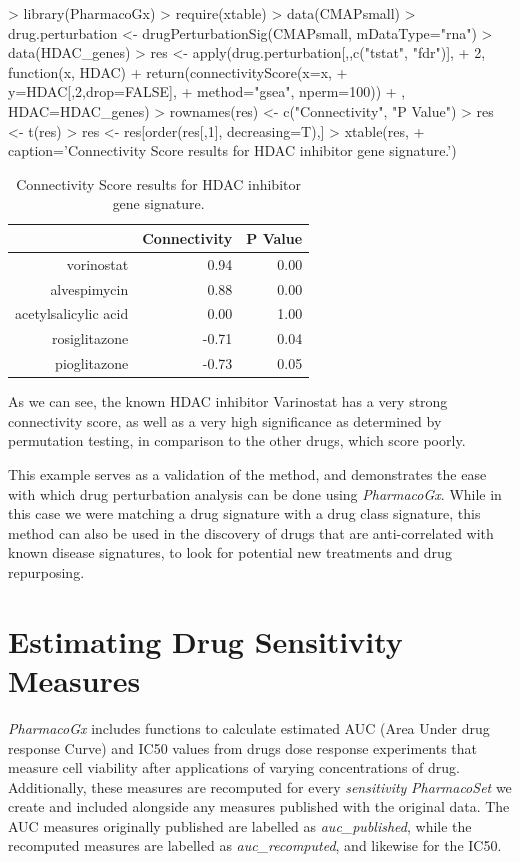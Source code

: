 \documentclass[11pt]{article}
\begin{document}
\begin{Schunk}
\begin{Sinput}
>   library(PharmacoGx)
>   require(xtable)
>   data(CMAPsmall)
>   drug.perturbation <- drugPerturbationSig(CMAPsmall, mDataType="rna")
>   data(HDAC_genes)
>   res <- apply(drug.perturbation[,,c("tstat", "fdr")],
+                2, function(x, HDAC){ 
+ 	    return(connectivityScore(x=x, 
+ 	                             y=HDAC[,2,drop=FALSE], 
+ 	                             method="gsea", nperm=100))
+ 	}, HDAC=HDAC_genes)
>   rownames(res) <- c("Connectivity", "P Value")
>   res <- t(res)
>   res <- res[order(res[,1], decreasing=T),]
>   xtable(res, 
+     caption='Connectivity Score results for HDAC inhibitor gene signature.')
\end{Sinput}
\begin{table}[ht]
\centering
\begin{tabular}{rrr}
  \hline
 & Connectivity & P Value \\ 
  \hline
vorinostat & 0.94 & 0.00 \\ 
  alvespimycin & 0.88 & 0.00 \\ 
  acetylsalicylic acid & 0.00 & 1.00 \\ 
  rosiglitazone & -0.71 & 0.04 \\ 
  pioglitazone & -0.73 & 0.05 \\ 
   \hline
\end{tabular}
\caption{Connectivity Score results for HDAC inhibitor gene signature.} 
\end{table}\end{Schunk}
As we can see, the known HDAC inhibitor Varinostat has a very strong connectivity score, as well as a very high significance as determined by permutation testing, in comparison to the other drugs, which score poorly. 

This example serves as a validation of the method, and demonstrates the ease with which drug perturbation analysis can be done using \textit{PharmacoGx}. While in this case we were matching a drug signature with a drug class signature, this method can also be used in the discovery of drugs that are anti-correlated with known disease signatures, to look for potential new treatments and drug repurposing.


\section{Estimating Drug Sensitivity Measures}
\textit{PharmacoGx} includes functions to calculate estimated AUC (Area Under
drug response Curve) and IC50 values from drugs dose response experiments that
measure cell viability after applications of varying concentrations of drug.
Additionally, these measures are recomputed for every \textit{sensitivity}
\textit{PharmacoSet} we create and included alongside any measures published
with the original data. The AUC measures originally published are labelled as \textit{auc\_published}, while the recomputed measures are labelled as \textit{auc\_recomputed}, and likewise for the IC50.
\end{document}
